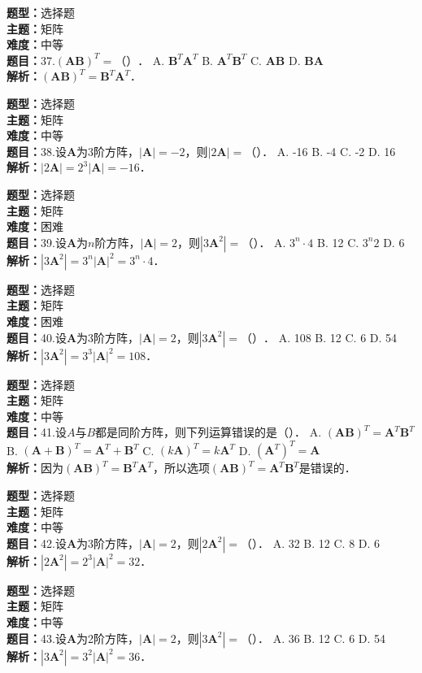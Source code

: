 \documentclass{ctexart}
\newenvironment{question}[5]{%
	\noindent\textbf{题型：}#1\\
	\textbf{主题：}#2\\
	\textbf{难度：}#3\\
	\textbf{题目：}#4\\
	\textbf{解析：}#5\\
	\vspace{1em}
}{}
\begin{document}
	\begin{question}
		{选择题}
		{矩阵}
		{中等}
		{37.\((\mathbf{A B})^T=（）\)．
			A. \(\mathbf{B}^T \mathbf{A}^T\)
			B. \(\mathbf{A}^T \mathbf{B}^T\)
			C. \(\mathbf{A B}\)
			D. \(\mathbf{B A}\)}
		{\((\mathbf{A B})^T=\mathbf{B}^T \mathbf{A}^T\)．}
	\end{question}
	
	\begin{question}
		{选择题}
		{矩阵}
		{中等}
		{38.设\(\mathbf{A}\)为3阶方阵，\(|\mathbf{A}|=-2\)，则\(|2 \mathbf{A}|=\)（）．
			A. -16
			B. -4
			C. -2
			D. 16}
		{\(|2 \mathbf{A}|=2^3|\mathbf{A}|=-16\)．}
	\end{question}
	
	\begin{question}
		{选择题}
		{矩阵}
		{困难}
		{39.设\(\mathbf{A}\)为\(n\)阶方阵，\(|\mathbf{A}|=2\)，则\(\left|3 \mathbf{A}^2\right|=\)（）．
			A. \(3^n \cdot 4\)
			B. 12
			C. \(3^n 2\)
			D. 6}
		{\(\left|3 \mathbf{A}^2\right|=3^n|\mathbf{A}|^2=3^n \cdot 4\)．}
	\end{question}
	
	\begin{question}
		{选择题}
		{矩阵}
		{困难}
		{40.设\(\mathbf{A}\)为3阶方阵，\(|\mathbf{A}|=2\)，则\(\left|3 \mathbf{A}^2\right|=（）\)．
			A. 108
			B. 12
			C. 6
			D. 54}
		{\(\left|3 \mathbf{A}^2\right|=3^3|\mathbf{A}|^2=108\)．}
	\end{question}
	
	
	\begin{question}
		{选择题}
		{矩阵}
		{中等}
		{41.设\(A\)与\(B\)都是同阶方阵，则下列运算错误的是（）．
			A. \((\mathbf{A B})^T=\mathbf{A}^T \mathbf{B}^T\)
			B. \((\mathbf{A}+\mathbf{B})^T=\mathbf{A}^T+\mathbf{B}^T\)
			C. \((k \mathbf{A})^T=k \mathbf{A}^T\)
			D. \(\left(\mathbf{A}^T\right)^T=\mathbf{A}\)}
		{因为\((\mathbf{A B})^T=\mathbf{B}^T \mathbf{A}^T\)，所以选项\((\mathbf{A B})^T=\mathbf{A}^T \mathbf{B}^T\)是错误的．}
	\end{question}
	
	\begin{question}
		{选择题}
		{矩阵}
		{中等}
		{42.设\(\mathbf{A}\)为3阶方阵，\(|\mathbf{A}|=2\)，则\(\left|2 \mathbf{A}^2\right|=\)（）．
			A. 32
			B. 12
			C. 8
			D. 6}
		{\(\left|2 \mathbf{A}^2\right|=2^3|\mathbf{A}|^2=32\)．}
	\end{question}
	
	\begin{question}
		{选择题}
		{矩阵}
		{中等}
		{43.设\(\mathbf{A}\)为2阶方阵，\(|\mathbf{A}|=2\)，则\(\left|3 \mathbf{A}^2\right|=\)（）．
			A. 36
			B. 12
			C. 6
			D. 54}
		{\(\left|3 \mathbf{A}^2\right|=3^2|\mathbf{A}|^2=36\)．}
	\end{question}
	
\end{document}

